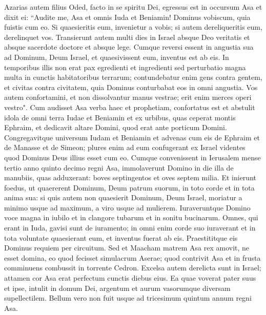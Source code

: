 \begin{biblechapter}  
\verse Azarias autem filius Oded, facto in se spiritu Dei, 
\verse egressus est in occursum Asa et dixit ei: “Audite me, Asa et omnis Iuda et Beniamin! Dominus vobiscum, quia fuistis cum eo. Si quaesieritis eum, invenietur a vobis; si autem dereliqueritis eum, derelinquet vos. 
\verse Transierunt autem multi dies in Israel absque Deo veritatis et absque sacerdote doctore et absque lege. 
\verse Cumque reversi essent in angustia sua ad Dominum, Deum Israel, et quaesivissent eum, inventus est ab eis. 
\verse In temporibus illis non erat pax egredienti et ingredienti sed perturbatio magna multa in cunctis habitatoribus terrarum; 
\verse contundebatur enim gens contra gentem, et civitas contra civitatem, quia Dominus conturbabat eos in omni angustia. 
\verse Vos autem confortamini, et non dissolvantur manus vestrae; erit enim merces operi vestro". 
\verse Cum audisset Asa verba haec et prophetiam, confortatus est et abstulit idola de omni terra Iudae et Beniamin et ex urbibus, quas ceperat montis Ephraim, et dedicavit altare Domini, quod erat ante porticum Domini. 
\verse Congregavitque universum Iudam et Beniamin et advenas cum eis de Ephraim et de Manasse et de Simeon; plures enim ad eum confugerant ex Israel videntes quod Dominus Deus illius esset cum eo. 
\verse Cumque convenissent in Ierusalem mense tertio anno quinto decimo regni Asa, 
\verse immolaverunt Domino in die illa de manubiis, quas adduxerant: boves septingentos et oves septem milia. 
\verse Et inierunt foedus, ut quaererent Dominum, Deum patrum suorum, in toto corde et in tota anima sua: 
\verse si quis autem non quaesierit Dominum, Deum Israel, moriatur a minimo usque ad maximum, a viro usque ad mulierem. 
\verse Iuraveruntque Domino voce magna in iubilo et in clangore tubarum et in sonitu bucinarum. 
\verse Omnes, qui erant in Iuda, gavisi sunt de iuramento; in omni enim corde suo iuraverant et in tota voluntate quaesierant eum, et inventus fuerat ab eis. Praestititque eis Dominus requiem per circuitum. 
\verse Sed et Maacham matrem Asa rex amovit, ne esset domina, eo quod fecisset simulacrum Aserae; quod contrivit Asa et in frusta comminuens combussit in torrente Cedron. 
\verse Excelsa autem derelicta sunt in Israel; attamen cor Asa erat perfectum cunctis diebus eius. 
\verse Ea quae voverat pater suus et ipse, intulit in domum Dei, argentum et aurum vasorumque diversam supellectilem.  
\verse Bellum vero non fuit usque ad tricesimum quintum annum regni Asa. 
\end{biblechapter}

